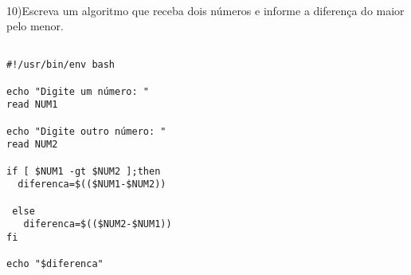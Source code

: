 \documentclass[a4paper,13pt]{article}
\begin{document}
\\
10)Escreva um algoritmo que receba dois números e informe a diferença do maior
pelo menor.
\\
\begin{verbatim}

#!/usr/bin/env bash

echo "Digite um número: "
read NUM1

echo "Digite outro número: "
read NUM2

if [ $NUM1 -gt $NUM2 ];then
  diferenca=$(($NUM1-$NUM2))

 else
   diferenca=$(($NUM2-$NUM1))
fi

echo "$diferenca"
\end{verbatim}
\end{document}
